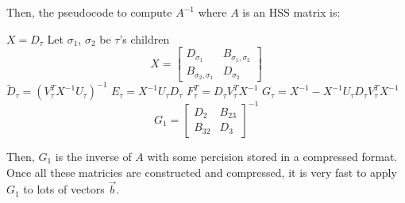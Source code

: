 Then, the pseudocode to compute $A^{-1}$ where $A$ is an HSS matrix is:
\begin{algorithm}[h!]
    \begin{algorithmic}
                \STATE $X=D_{\tau}$
            \ELSE
                \STATE Let $\sigma_1$, $\sigma_2$ be $\tau$'s children
                \STATE \begin{equation*}
                    X = \begin{bmatrix}
                        D_{\sigma_1}  & B_{\sigma_1, \sigma_2} \\
                        B_{\sigma_2, \sigma_1} & D_{\sigma_2}
                \end{bmatrix}
            \end{equation*}
            \ENDIF
            \STATE $\widetilde{D}_{\tau} = \left( V^T_{\tau}X^{-1} U_{\tau}\right)^{-1}$
            \STATE $E_{\tau} = X^{-1}  U_{\tau} D_{\tau}$
            \STATE $F^T_{\tau} = D_{\tau} V^T_{\tau}X^{-1}$
            \STATE $G_{\tau} = X^{-1} - X^{-1}U_{\tau}D_{\tau} V^T_{\tau}X^{-1}$
        \ENDFOR
    \ENDFOR
    \STATE  \begin{equation*}
        G_1 =
        \begin{bmatrix}
            D_2 & B_{23}\\
            B_{32} & D_3
        \end{bmatrix}^{-1}
\end{equation*}
      \end{algorithmic}
  \end{algorithm}

Then, $G_1$ is the inverse of $A$ with some percision stored in a compressed format. Once all these matricies are constructed and compressed, it is very fast to apply $G_1$ to lots of vectors $\vec{b}$.

